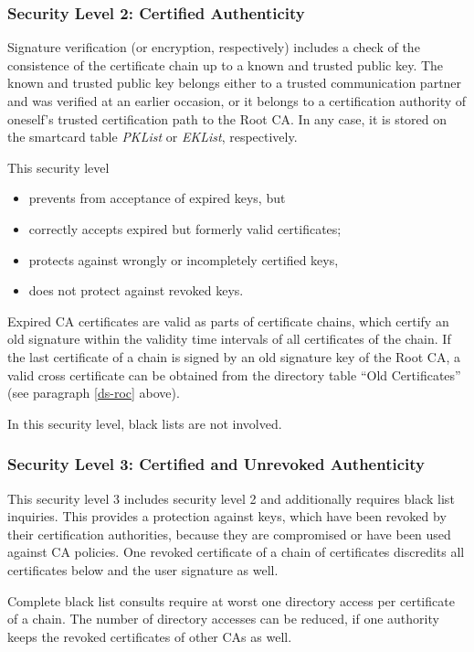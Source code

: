 \subsubsection{Security Level 2: Certified Authenticity}
\label{sl-sv2}

Signature verification (or encryption, respectively)
includes a check of the consistence of the certificate chain up to
a known and trusted public key.
The known and trusted public key belongs either to
a trusted communication partner and was verified
at an earlier occasion,
or it belongs to a certification authority of oneself's trusted
certification path to the Root CA.
In any case, it is stored on the smartcard table {\em PKList}
or {\em EKList}, respectively.

This security level
 
\begin{itemize}
\item prevents from acceptance of expired keys, but
\item correctly accepts expired but formerly valid certificates;
\item protects against wrongly or incompletely certified keys,
\item does not protect against revoked keys.
\end{itemize}
 
Expired CA certificates are valid as parts of certificate chains,
which certify an old signature within the validity time intervals of all
certificates of the chain.
If the last certificate of a chain is signed by an old signature key
of the Root CA,
a valid cross certificate can be obtained from the directory table
``Old Certificates'' (see paragraph \ref{ds-roc} above).

In this security level, black lists are not involved.

\subsubsection{Security Level 3:
Certified and Unrevoked Authenticity}
\label{sl-sv3}

This security level 3 includes
security level 2 and additionally requires black list inquiries.
This provides a protection against keys,
which have been revoked by their certification authorities,
because they are compromised or have been used against CA policies.
One revoked certificate of a chain of certificates discredits
all certificates below and the user signature as well.

Complete black list consults require
at worst one directory access per certificate of a chain.
The number of directory accesses can be reduced, if one authority
keeps the revoked certificates of other CAs as well.

